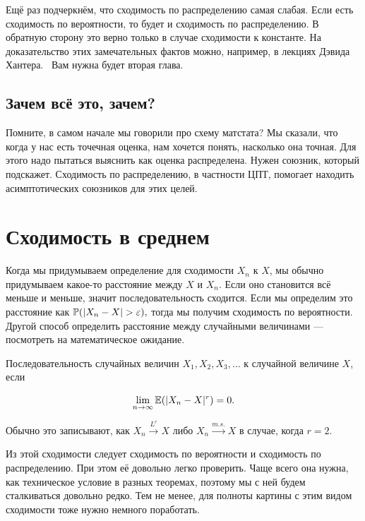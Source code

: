 \documentclass[12pt, a4paper, oneside]{article}
\begin{document}
Ещё раз подчеркнём, что сходимость по распределению самая слабая. Если есть сходимость по вероятности, то будет и сходимость по распределению. В обратную сторону это верно только в случае сходимости к константе. На доказательство этих замечательных фактов можно, например, в лекциях Дэвида Хантера.~\cite{ref:hanter} Вам нужна будет вторая глава.

\subsection{Зачем всё это, зачем?}

Помните, в самом начале мы говорили про схему матстата? Мы сказали, что когда у нас есть точечная оценка, нам хочется понять, насколько она точная. Для этого надо пытаться выяснить как оценка распределена. Нужен союзник, который подскажет. Сходимость по распределению, в частности ЦПТ, помогает находить асимптотических союзников для этих целей. 


\section{Сходимость в среднем} 

Когда мы придумываем определение для сходимости $X_n$ к $X$, мы обычно придумываем какое-то расстояние между $X$ и $X_n$. Если оно становится всё меньше и меньше, значит последовательность сходится. Если мы определим это расстояние как $\mathbb{P}(|X_n - X| > \varepsilon),$ тогда мы получим сходимость по вероятности. Другой способ определить расстояние между случайными величинами --- посмотреть на математическое ожидание. 

\begin{definition} 
Последовательность случайных величин $X_1, X_2, X_3, \ldots$  к случайной величине $X$, если 

\[
\lim_{n \to \infty} \mathbb{E}(|X_n - X|^r) = 0.
\]

Обычно это записывают, как $X_n \overset{L^r}{\to} X$ либо $X_n \overset{m.s.}{\to} X$ в случае, когда $r=2$.
\end{definition}

Из этой сходимости следует сходимость по вероятности и сходимость по распределению. При этом её довольно легко проверить. Чаще всего она нужна, как техническое условие в разных теоремах, поэтому мы с ней будем сталкиваться довольно редко. Тем не менее, для полноты картины с этим видом сходимости тоже нужно немного поработать.
\end{document}
